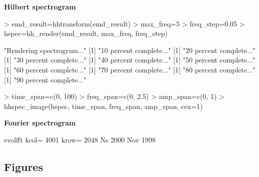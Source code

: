 \documentclass[12pt]{article}
\begin{document}
\textbf{Hilbert spectrogram}

\begin{Schunk}
\begin{Sinput}
> emd_result=hhtransform(emd_result)
> max_freq=5
> freq_step=0.05
> hspec=hh_render(emd_result, max_freq, freq_step)
\end{Sinput}
\begin{Soutput}
[1] "Rendering spectrogram..."
[1] "10  percent complete..."
[1] "20  percent complete..."
[1] "30  percent complete..."
[1] "40  percent complete..."
[1] "50  percent complete..."
[1] "60  percent complete..."
[1] "70  percent complete..."
[1] "80  percent complete..."
[1] "90  percent complete..."
\end{Soutput}
\end{Schunk}

\begin{Schunk}
\begin{Sinput}
> time_span=c(0, 100)
> freq_span=c(0, 2.5)
> amp_span=c(0, 1)
> hhspec_image(hspec, time_span, freq_span, amp_span, cex=1)
\end{Sinput}
\end{Schunk}

\textbf{Fourier spectrogram}
\begin{Schunk}
\begin{Soutput}
evolfft kcol= 4001 krow= 2048 Ns 2000 Nov 1998
\end{Soutput}
\end{Schunk}

\FloatBarrier

\subsection{Figures}
\end{document}
